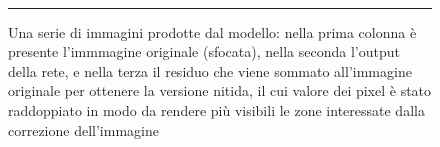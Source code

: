 \documentclass[a4paper,10pt,twocolumn]{article}
\begin{document}
\begin{figure}[b!]
\begin{mdframed}[
      linewidth=1pt,
      innertopmargin=6pt,
      innerbottommargin=6pt,
      innerleftmargin=6pt,
      innerrightmargin=6pt
      linecolor=black,
      nobreak
    ]
{    }\hspace{0.1cm}\hfill
    \hspace{0.1cm}\hfill
    \hspace{0.1cm}\hfill
    \\ \vspace{0.3cm}

    \vspace{3pt}
    \hrule
    \vspace{3pt}
    \caption{
      Una serie di immagini prodotte dal modello: nella prima colonna è presente l'immmagine originale (sfocata), nella seconda l'output della rete,
      e nella terza il residuo che viene sommato all'immagine originale per ottenere la versione nitida,
      il cui valore dei pixel è stato raddoppiato in modo da rendere più visibili le zone interessate dalla correzione dell'immagine
    }
  \end{mdframed}
  \label{foto_esempio}
\end{figure}

\FloatBarrier

\printglossary[title=Glossario, toctitle=Glossario]

\printbibliography
\end{document}
